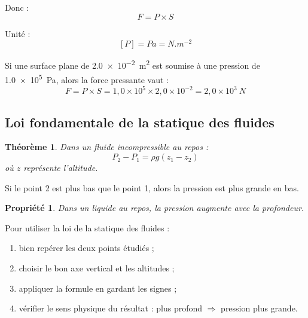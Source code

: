 \documentclass[11pt,a4paper]{article}
\newtheorem{propriete}{Propriété}[section]
\newtheorem{theoreme}{Théorème}[section]
\begin{document}
Donc :
\[
F=P\times S
\]

Unité :
\[
[P]=\si{Pa}=\si{N.m^{-2}}
\]

\begin{applicationbox}
Si une surface plane de \SI{2,0e-2}{m^2} est soumise à une pression de \SI{1,0e5}{Pa}, alors la force pressante vaut :
\[
F=P\times S = 1,0\times 10^5 \times 2,0\times 10^{-2}=2,0\times 10^3\ \si{N}
\]
\end{applicationbox}

\subsection{Loi fondamentale de la statique des fluides}

\begin{theoreme}
Dans un fluide incompressible au repos :
\[
P_2-P_1=\rho g(z_1-z_2)
\]
où $z$ représente l'altitude.
\end{theoreme}

Si le point 2 est plus bas que le point 1, alors la pression est plus grande en bas.

\begin{propriete}
Dans un liquide au repos, la pression augmente avec la profondeur.
\end{propriete}

\begin{center}
\end{center}

\begin{methodebox}
Pour utiliser la loi de la statique des fluides :
\begin{enumerate}
    \item bien repérer les deux points étudiés ;
    \item choisir le bon axe vertical et les altitudes ;
    \item appliquer la formule en gardant les signes ;
    \item vérifier le sens physique du résultat : plus profond $\Rightarrow$ pression plus grande.
\end{enumerate}
\end{methodebox}
\end{document}
